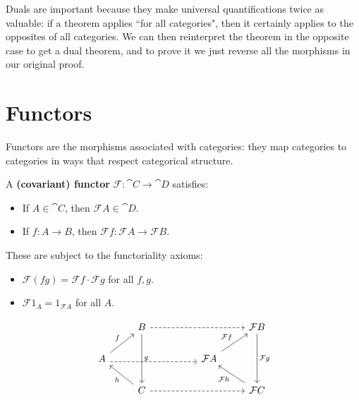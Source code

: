 \documentclass[twoside,10pt]{report}
\begin{document}
Duals are important because they make universal quantifications twice as valuable: if a theorem applies ``for all categories", then it certainly applies to the opposites of all categories. We can then reinterpret the theorem in the opposite case to get a dual theorem, and to prove it we just reverse all the morphisms in our original proof.



\section{Functors}

Functors are the morphisms associated with categories: they map categories to categories in ways that respect categorical structure.

\begin{defn}
	A \textbf{(covariant) functor} $\mathcal{F}:\cat{C}\to \cat{D}$ satisfies:
	\begin{itemize}
		\item If $A \in \cat{C}$, then $\mathcal{F}A \in \cat{D}$.
		\item If $f:A \to B$, then $\mathcal{F}f:\mathcal{F}A\to \mathcal{F}B$.
	\end{itemize}
	These are subject to the functoriality axioms:
	\begin{itemize}
		\item $\mathcal{F}(fg) = \mathcal{F}f \cdot \mathcal{F}g$ for all $f,g$.
		\item $\mathcal{F}1_{A} = 1_{\mathcal{F}A}$ for all $A$.
	\end{itemize}
\end{defn}
\[
\begin{tikzcd}
                                                   & B \arrow[dd, "g"] \arrow[rrr, dashed] &  &                                           & \mathcal{F}B \arrow[dd, "\mathcal{F}g"] \\
A \arrow[ru, "f"] \arrow[rrr, dashed, shift right] &                                       &  & \mathcal{F}A \arrow[ru, "\mathcal{F}f"] &                                           \\
                                                   & C \arrow[lu, "h"] \arrow[rrr, dashed] &  &                                           & \mathcal{F}C \arrow[lu, "\mathcal{F}h"]
\end{tikzcd}
\] 
\end{document}
